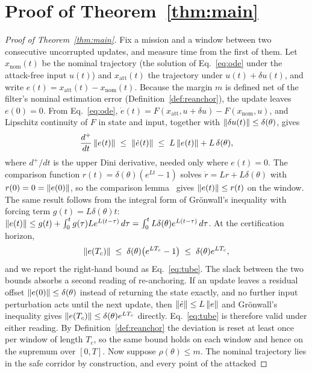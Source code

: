 \section{Proof of Theorem~\ref{thm:main}}
\label{app:proof}
\begin{proof}[Proof of Theorem~\ref{thm:main}]
Fix a mission and a window between two consecutive uncorrupted updates, and
measure time from the first of them. Let $x_{\mathrm{nom}}(t)$ be the nominal
trajectory (the solution of Eq.~\eqref{eq:ode} under the attack-free input
$u(t)$) and $x_{\mathrm{att}}(t)$ the trajectory under $u(t)+\delta u(t)$, and
write $e(t)=x_{\mathrm{att}}(t)-x_{\mathrm{nom}}(t)$. Because the margin $m$ is
defined net of the filter's nominal estimation error
(Definition~\ref{def:reanchor}), the update leaves $e(0)=0$. From
Eq.~\eqref{eq:ode},
$\dot e(t)=F(x_{\mathrm{att}},u+\delta u)-F(x_{\mathrm{nom}},u)$, and
Lipschitz continuity of $F$ in state and input, together with
$\left\lVert \delta u(t)\right\rVert\le\delta(\theta)$, gives
\[
\frac{d^{+}}{dt}\left\lVert e(t)\right\rVert\;\le\;\left\lVert \dot e(t)\right\rVert\;\le\;L\left\lVert e(t)\right\rVert+L\,\delta(\theta),
\]
where $d^{+}/dt$ is the upper Dini derivative, needed only where $e(t)=0$. The
comparison function $r(t)=\delta(\theta)(e^{Lt}-1)$ solves
$\dot r=Lr+L\delta(\theta)$ with $r(0)=0=\left\lVert e(0)\right\rVert$, so the comparison
lemma~\cite{gronwall1919} gives $\left\lVert e(t)\right\rVert\le r(t)$ on the window. The same
result follows from the integral form of Gr\"onwall's inequality with forcing
term $g(t)=L\delta(\theta)t$:
$\left\lVert e(t)\right\rVert\le g(t)+\int_0^t g(\tau)Le^{L(t-\tau)}\,d\tau
=\int_0^t L\delta(\theta)e^{L(t-\tau)}\,d\tau$. At the certification horizon,
\begin{equation}
\label{eq:tube_derivation}
\left\lVert e(T_c)\right\rVert\;\le\;\delta(\theta)\big(e^{LT_c}-1\big)\;\le\;\delta(\theta)e^{LT_c},
\end{equation}
and we report the right-hand bound as Eq.~\eqref{eq:tube}. The slack between the
two bounds absorbs a second reading of re-anchoring. If an update leaves a
residual offset $\left\lVert e(0)\right\rVert\le\delta(\theta)$ instead of returning the state
exactly, and no further input perturbation acts until the next update, then
$\left\lVert \dot e\right\rVert\le L\left\lVert e\right\rVert$ and Gr\"onwall's inequality gives
$\left\lVert e(T_c)\right\rVert\le\delta(\theta)e^{LT_c}$ directly. Eq.~\eqref{eq:tube} is
therefore valid under either reading. By
Definition~\ref{def:reanchor} the deviation is reset at least once per window of
length $T_c$, so the same bound holds on each window and hence on the
supremum over $[0,T]$. Now suppose $\rho(\theta)\le m$. The nominal trajectory
lies in the safe corridor by construction, and every point of the attacked

\end{proof}

